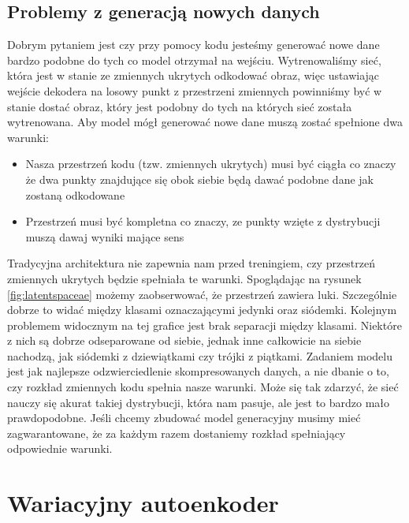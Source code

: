 \documentclass[a4paper,12pt]{book} %
\begin{document}
\section{Problemy z generacją nowych danych}
Dobrym pytaniem jest czy przy pomocy kodu jesteśmy generować nowe dane bardzo podobne do tych co model otrzymał na wejściu. Wytrenowaliśmy sieć, która jest w stanie ze zmiennych ukrytych odkodować obraz, więc ustawiając wejście dekodera na losowy punkt z przestrzeni zmiennych powinniśmy być w stanie dostać obraz, który jest podobny do tych na których sieć została wytrenowana.
Aby model mógł generować nowe dane muszą zostać spełnione dwa warunki:
\begin{itemize}
	\item Nasza przestrzeń kodu (tzw. zmiennych ukrytych) musi być ciągła co znaczy że dwa punkty znajdujące się obok siebie będą dawać podobne dane jak zostaną odkodowane
	\item Przestrzeń musi być kompletna co znaczy, ze punkty wzięte z dystrybucji muszą dawaj wyniki mające sens
\end{itemize}
Tradycyjna architektura nie zapewnia nam przed treningiem, czy przestrzeń zmiennych ukrytych będzie spełniała te warunki.
Spoglądając na rysunek \ref{fig:latentspaceae} możemy zaobserwować, że przestrzeń zawiera luki. Szczególnie dobrze to widać między klasami oznaczającymi jedynki oraz siódemki. Kolejnym problemem widocznym na tej grafice jest brak separacji między klasami. Niektóre z nich są dobrze odseparowane od siebie, jednak inne całkowicie na siebie nachodzą, jak siódemki z dziewiątkami czy trójki z piątkami. Zadaniem modelu jest jak najlepsze odzwierciedlenie skompresowanych danych, a nie dbanie o to, czy rozkład zmiennych kodu spełnia nasze warunki. Może się tak zdarzyć, że sieć nauczy się akurat takiej dystrybucji, która nam pasuje, ale jest to bardzo mało prawdopodobne. Jeśli chcemy zbudować model generacyjny musimy mieć zagwarantowane, że za każdym razem dostaniemy rozkład spełniający odpowiednie warunki. 
\chapter{Wariacyjny autoenkoder}
\end{document}
